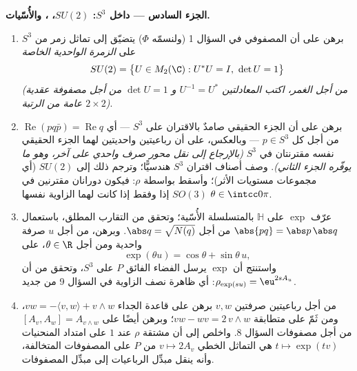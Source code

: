 \begin{problem}
\medskip
\noindent\textbf{الجزء السادس --- داخل $S^3$: $SU(2)$،
، والأُسّيات.}
\begin{enumerate}[resume]
  \item برهن على أن  المصفوفي في السؤال 1 (ولنسمّه
        $\Phi$) يتضيّق إلى تماثل زمر من $S^3$ على \emph{الزمرة
        الواحدية الخاصة}
        \[
        SU(2) = \bigl\{U \in M_2(\C) : U^*U = I,\ \det U =
        1\bigr\}
        \]
        \emph{(من أجل الغمر، اكتب المعادلتين $U^{-1} = U^*$
        و $\det U = 1$ من أجل مصفوفة عقدية عامة من الرتبة
        $2\times2$)}.
  \item برهن على أن الجزء الحقيقي صامدٌ بالاقتران على $S^3$ ---
        أي $\operatorname{Re}(pq\bar p) =
        \operatorname{Re}q$ من أجل كل $p \in S^3$ --- وبالعكس، على أن
        رباعيتين واحديتين لهما الجزء الحقيقي نفسه مقترنتان في
        $S^3$ \emph{(بالإرجاع إلى نقل محور صرف واحدي على آخر،
        وهو ما يوفّره الجزء الثاني)}. وصف أصناف اقتران $S^3$
        هندسيًّا؛ وترجم ذلك إلى $SU(2)$ (أي مجموعات مستويات
        الأثر)؛ وأسقط بواسطة $\rho$: فيكون دورانان مقترنين في
        $SO(3)$ إذا وفقط إذا كانت لهما الزاوية نفسها $\theta \in \intcc0\pi$.
  \item عرّف $\exp$ على $\mathbb H$ بالمتسلسلة الأُسّية؛ وتحقق
        من التقارب المطلق، باستعمال $\abs{pq} = \abs p\,\abs q$ من أجل $\abs q =
        \sqrt{N(q)}$.
        وبرهن، من أجل $u$ صرفة واحدية ومن أجل $\theta
        \in \R$، على
        \[
        \exp(\theta u) = \cos\theta + \sin\theta\,u ,
        \]
        واستنتج أن $\exp$ يرسل الفضاء الفائق $P$ على $S^3$،
        وتحقق من أن $\rho_{\exp(su)} =
        \eu^{2sA_u}$: أي ظاهرة نصف الزاوية في السؤال 9
        من جديد.
  \item من أجل رباعيتين صرفتين $v, w$ برهن على قاعدة الجداء
        $vw = -\langle v, w\rangle + v\wedge w$، ومن ثَمّ على متطابقة  $vw - wv = 2\,v\wedge w$؛ وبرهن
        أيضًا على $[A_v, A_w] = A_{v\wedge w}$ من أجل مصفوفات السؤال 8. واخلص إلى
        أن مشتقة $\rho$ عند $1$ على امتداد المنحنيات $t \mapsto \exp(tv)$
        هي التماثل الخطي $v \mapsto 2A_v$ من $P$ على
        المصفوفات المتخالفة، وأنه ينقل مبدِّل الرباعيات إلى
        مبدِّل المصفوفات.
\end{enumerate}


\end{problem}
